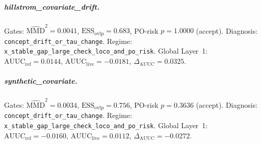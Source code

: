\documentclass{article}
\begin{document}
\subparagraph{hillstrom\_covariate\_drift.}
Gates: $\widehat{\mathrm{MMD}}^2=0.0041$, $\mathrm{ESS}_{\mathrm{ovlp}}=0.683$, PO-risk $p=1.0000$ (accept). Diagnosis: \texttt{concept\_drift\_or\_tau\_change}. Regime: \texttt{x\_stable\_gap\_large\_check\_loco\_and\_po\_risk}.
Global Layer~1: $\mathrm{AUUC}_{\mathrm{ref}}=0.0144$, $\mathrm{AUUC}_{\mathrm{live}}=-0.0181$, $\Delta_{\mathrm{AUUC}}=0.0325$.


\subparagraph{synthetic\_covariate.}
Gates: $\widehat{\mathrm{MMD}}^2=0.0034$, $\mathrm{ESS}_{\mathrm{ovlp}}=0.756$, PO-risk $p=0.3636$ (accept). Diagnosis: \texttt{concept\_drift\_or\_tau\_change}. Regime: \texttt{x\_stable\_gap\_large\_check\_loco\_and\_po\_risk}.
Global Layer~1: $\mathrm{AUUC}_{\mathrm{ref}}=-0.0160$, $\mathrm{AUUC}_{\mathrm{live}}=0.0112$, $\Delta_{\mathrm{AUUC}}=-0.0272$.
\end{document}
